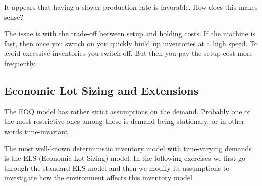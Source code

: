 \begin{exercise}
It appears that having a slower production rate is favorable. How does this makes sense?

\begin{solution}
The issue is with the trade-off between setup and holding costs. If the machine is fast, then once you switch on you quickly build up inventories at a high speed. To avoid excessive inventories you switch off. But then you pay the setup cost more frequently. 
\end{solution}
\end{exercise}


\subsection{Economic Lot Sizing and Extensions}

The EOQ model has rather strict assumptions on the demand. Probably one of the most restrictive ones among those is demand being stationary, or in other words time-invariant.

The most well-known deterministic inventory model with time-varying demands is the ELS (Economic Lot Sizing) model. In the following exercises we first go through the standard ELS model and then we modify its assumptions to investigate how the environment affects this inventory model. 

